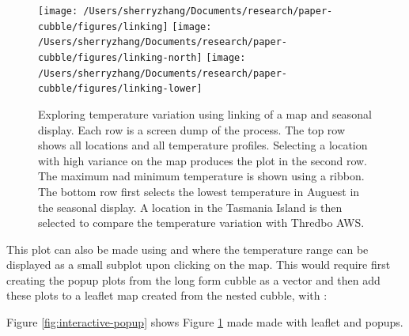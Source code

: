 \documentclass[
]{jss}
\begin{document}
\begin{CodeChunk}
\begin{figure}

{\centering \texttt{[image: /Users/sherryzhang/Documents/research/paper-cubble/figures/linking]} \texttt{[image: /Users/sherryzhang/Documents/research/paper-cubble/figures/linking-north]} \texttt{[image: /Users/sherryzhang/Documents/research/paper-cubble/figures/linking-lower]} 

}

\caption[Exploring temperature variation using linking of a map and seasonal display]{Exploring temperature variation using linking of a map and seasonal display. Each row is a screen dump of the process. The top row shows all locations and all temperature profiles. Selecting a location with high variance on the map produces the plot in the second row. The maximum nad minimum temperature is shown using a ribbon. The bottom row first selects the lowest temperature in Auguest in the seasonal display. A location in the Tasmania Island is then selected to compare the temperature variation with Thredbo AWS.}\label{fig:interactive-linking}
\end{figure}
\end{CodeChunk}

This plot can also be made using  and  where
the temperature range can be displayed as a small subplot upon clicking
on the map. This would require first creating the popup plots from the
long form cubble as a vector and then add these plots to a leaflet map
created from the nested cubble, with :

\begin{CodeChunk}
\end{CodeChunk}

Figure \ref{fig:interactive-popup} shows Figure
\ref{fig:interactive-linking} made made with leaflet and popups.
\end{document}
